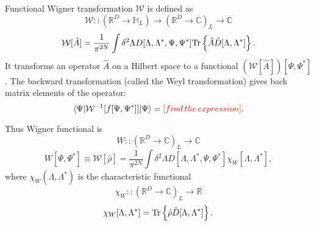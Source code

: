 Functional Wigner transformation $\mathcal{W}$ is defined as
\[
	\mathcal{W} ::
	(\mathbb{R}^D \rightarrow \mathbb{H}_L)
	\rightarrow
	(\mathbb{R}^D \rightarrow \mathbb{C})_L
	\rightarrow
	\mathbb{C}
\]
\begin{equation}
\label{eqn:formalism:func-wigner:w-transformation}
	\mathcal{W}[\hat{A}]
	= \frac{1}{\pi^{2N}} \int \delta^2 \Lambda
		D[\Lambda, \Lambda^*, \Psi, \Psi^*]
		\mathrm{Tr} \left\{  \hat{A} \hat{D}[\Lambda, \Lambda^*]  \right\}.
\end{equation}
It transforms an operator $\hat{A}$ on a Hilbert space to a functional $(\mathcal{W}[\hat{A}])[\Psi, \Psi^*]$.
The backward transformation (called the Weyl transformation) gives back matrix elements of the operator:
\[
	\langle \Psi \lvert \mathcal{W}^{-1}[f[\Psi, \Psi^*]] \rvert \Psi \rangle
	= \textcolor{red}{[find\,the\,expression]}.
\]

Thus Wigner functional is
\[
	W :: (\mathbb{R}^D \rightarrow \mathbb{C})_L \rightarrow \mathbb{C}
\]
\begin{equation}
\label{eqn:formalism:func-wigner:w-functional}
	W [\Psi, \Psi^*]
	\equiv \mathcal{W}[\hat{\rho}]
	= \frac{1}{\pi^{2N}} \int \delta^2 \Lambda
		D[\Lambda, \Lambda^*, \Psi, \Psi^*]
		\chi_W [\Lambda, \Lambda^*],
\end{equation}
where $\chi_W (\Lambda, \Lambda^*)$ is the characteristic functional
\[
	\chi_W :: (\mathbb{R}^D \rightarrow \mathbb{C})_L \rightarrow \mathbb{R}
\]
\[
	\chi_W [\Lambda, \Lambda^*]
	= \mathrm{Tr} \left\{  \hat{\rho} \hat{D}[\Lambda, \Lambda^*]  \right\}.
\]

